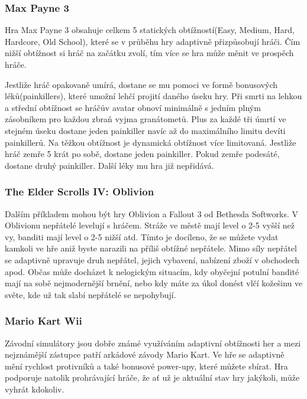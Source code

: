 \subsubsection{Max Payne 3}

Hra Max Payne 3 obsahuje celkem 5 statických obtížností(Easy, Medium, Hard, Hardcore, Old School), které se v průběhu hry adaptivně přizpůsobují hráči. Čím nižší obtížnost si hráč na začátku zvolí, tím více se hra může měnit ve prospěch hráče.

Jestliže hráč opakovaně umírá, dostane se mu pomoci ve formě bonusových léků(painkillers), které umožní lehčí projití daného úseku hry. Při smrti na lehkou a střední obtížnost se hráčův avatar obnoví minimálně s jedním plným zásobníkem pro každou zbraň vyjma granátometů. Plus za každé tři úmrtí ve stejném úseku dostane jeden painkiller navíc až do maximálního limitu devíti painkillerů.
Na těžkou obtížnost je dynamická obtížnost více limitovaná. Jestliže hráč zemře 5 krát po sobě, dostane jeden painkiller. Pokud zemře podesáté, dostane druhý painkiller. Další léky mu hra již nepřidává. \cite{3}

\subsubsection{The Elder Scrolls IV: Oblivion}

Dalším příkladem mohou být hry Oblivion a Fallout 3 od Bethesda Softworks. V Oblivionu nepřátelé levelují s hráčem. Stráže ve městě mají level o 2-5 vyšší než vy, banditi mají level o 2-5 nižší atd. Tímto je docíleno, že se můžete vydat kamkoli ve hře aniž byste narazili na příliš obtížné nepřátele. Mimo síly nepřátel se adaptivně upravuje druh nepřátel, jejich vybavení, nabízení zboží v obchodech apod. Občas může docházet k nelogickým situacím, kdy obyčejní potulní bandité mají na sobě nejmodernější brnění, nebo kdy máte za úkol donést vlčí kožešinu ve světe, kde už tak slabí nepřátelé se nepohybují. \cite{4}

\subsubsection{Mario Kart Wii}

Závodní simulátory jsou dobře známé využíváním adaptivní obtížnosti her a mezi nejznámější zástupce patří arkádové závody Mario Kart. Ve hře se adaptivně mění rychlost protivníků a také bonusové power-upy, které můžete sbírat. Hra podporuje natolik prohrávající hráče, že ať už je aktuální stav hry jakýkoli, může vyhrát kdokoliv.

